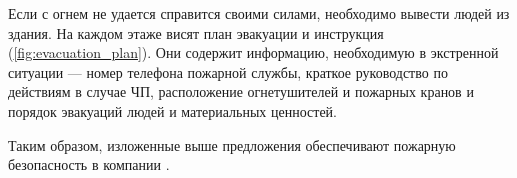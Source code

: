 Если с огнем не удается справится своими силами, необходимо вывести людей из здания. На каждом этаже висят план эвакуации и инструкция (\autoref{fig:evacuation_plan}). Они содержит информацию, необходимую в экстренной ситуации --- номер телефона пожарной службы, краткое руководство по действиям в случае ЧП, расположение огнетушителей и пожарных кранов и порядок эвакуаций людей и материальных ценностей.

Таким образом, изложенные выше предложения обеспечивают пожарную безопасность в компании \yandexbel{}.
